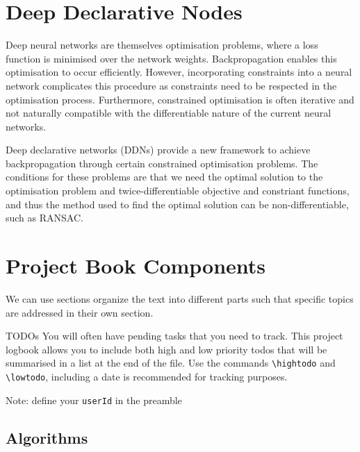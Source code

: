 \documentclass{project-logbook}
\begin{document}
\section{Deep Declarative Nodes} \label{sec:ddn}
Deep neural networks are themselves optimisation problems, where a loss function is minimised over the network weights. Backpropagation enables this optimisation to occur efficiently. However, incorporating constraints into a neural network complicates this procedure as constraints need to be respected in the optimisation process. Furthermore, constrained optimisation is often iterative and not naturally compatible with the differentiable nature of the current neural networks.

Deep declarative networks (DDNs) provide a new framework to achieve backpropagation through certain constrained optimisation problems. The conditions for these problems are that we need the optimal solution to the optimisation problem and twice-differentiable objective and constriant functions, and thus the method used to find the optimal solution can be non-differentiable, such as RANSAC.

\section{Project Book Components} \label{sec:topic_B}

	We can use sections organize the text into different parts  such that specific topics are addressed in their own section.

		\begin{HighlightedNote}{TODOs}
			You will often have pending tasks that you need to track. This project logbook allows you to include both high and low priority todos that will be summarised in a list at the end of the file. Use the commands \texttt{\textbackslash hightodo} and \texttt{\textbackslash lowtodo}, including a date is recommended for tracking purposes.

			Note: define your \texttt{userId} in the preamble
		\end{HighlightedNote}





		\subsection{Algorithms} \label{sub:algorithms}
\end{document}
